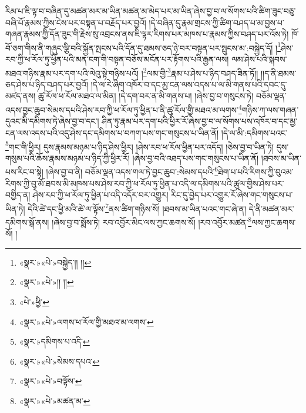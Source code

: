 རིམ་པ་ཇི་ལྟ་བ་བཞིན་དུ་མཚན་མར་མ་ཡིན་མཚན་མ་མེད་པར་མ་ཡིན་ཞེས་བྱ་བ་ལ་སོགས་པའི་ཚིག་ཟུང་བཅུ་བཞི་པོ་རྣམས་ཀྱིས་ངེས་པར་བསྟན་པ་བརྗོད་པར་བྱའོ། །དེ་བཞིན་དུ་རྣམ་གྲངས་ཀྱི་ཚིག་བཤད་པ་མ་བྱས་པ་གཞན་རྣམས་ཀྱི་དོན་ཟུང་གི་རྗེས་སུ་འབྲངས་ནས་ཇི་ལྟར་རིགས་པར་མཁས་པ་རྣམས་ཀྱིས་བཤད་པར་འོས་ཏེ། ཁོ་བོ་ཅག་གིས་ནི་གཞུང་ལྕི་བའི་སྐྱོན་སྤངས་པའི་དོན་དུ་ཐམས་ཅད་ཉེ་བར་བསྟན་པར་སྤུངས་མ་:བསྐྱེད་དོ། །\footnote{«སྣར་»«པེ་»བསྐྱེད་།། །།}ཤེས་རབ་ཀྱི་ཕ་རོལ་ཏུ་ཕྱིན་པའི་མན་ངག་གི་བསྟན་བཅོས་མངོན་པར་རྟོགས་པའི་རྒྱན་ལས། ལམ་ཤེས་པའི་སྐབས་མཐའ་གཉིས་རྣམ་པར་དག་པའི་ལེའུ་སྟེ་གཉིས་པའོ། །\footnote{«སྣར་»«པེ་»།། །།}ལམ་གྱི་\footnote{«པེ་»ཕྱི་}རྣམ་པ་ཤེས་པ་ཉིད་བཤད་ཟིན་ཏོ།། །།ད་ནི་ཐམས་ཅད་ཤེས་པ་ཉིད་བཤད་པར་བྱའོ། །དེ་ལ་རེ་ཞིག་འཁོར་བ་དང་མྱ་ངན་ལས་འདས་པ་ལ་མི་གནས་པའི་དབང་དུ་མཛད་ནས། ཚུ་རོལ་ཕ་རོལ་མཐའ་ལ་མིན། །དེ་དག་བར་ན་མི་གནས་པ། །ཞེས་བྱ་བ་གསུངས་ཏེ། བཅོམ་ལྡན་འདས་བྱང་ཆུབ་སེམས་དཔའི་ཤེས་རབ་ཀྱི་ཕ་རོལ་ཏུ་ཕྱིན་པ་ནི་ཚུ་རོལ་གྱི་མཐའ་མ་ལགས་\footnote{«སྣར་»«པེ་»ལགས་ཕ་རོལ་གྱི་མཐའ་མ་ལགས་}གཉིས་ཀ་ལས་གཞན་དུའང་མི་དམིགས་ཏེ་ཞེས་བྱ་བ་དང་། ཤིན་ཏུ་རྣམ་པར་དག་པའི་ཕྱིར་རོ་ཞེས་བྱ་བ་ལ་སོགས་པས་འཁོར་བ་དང་མྱ་ངན་ལས་འདས་པའི་འདུ་ཤེས་དང་དམིགས་པ་བཀག་པས་གང་གསུངས་པ་ཡིན་ནོ། །དེ་ལ་མི་:དམིགས་པའང་\footnote{«སྣར་»དམིགས་པ་འདི་}གང་གི་ཕྱིར། དུས་རྣམས་མཉམ་པ་ཉིད་ཤེས་ཕྱིར། །ཤེས་རབ་ཕ་རོལ་ཕྱིན་པར་འདོད། །ཅེས་བྱ་བ་ཡིན་ཏེ། དུས་གསུམ་པའི་ཆོས་རྣམས་མཉམ་པ་ཉིད་ཀྱི་ཕྱིར་རོ། །ཞེས་བྱ་བའི་འཐད་པས་གང་གསུངས་པ་ཡིན་ནོ། །ཐབས་མ་ཡིན་པས་རིང་བ་སྟེ། །ཞེས་བྱ་བ་ནི། བཅོམ་ལྡན་འདས་གལ་ཏེ་བྱང་ཆུབ་:སེམས་དཔའི་\footnote{«སྣར་»«པེ་»སེམས་དཔའ་}ཐེག་པ་པའི་རིགས་ཀྱི་བུའམ་རིགས་ཀྱི་བུ་མོ་ཐབས་མི་མཁས་པས་ཤེས་རབ་ཀྱི་ཕ་རོལ་ཏུ་ཕྱིན་པ་འདི་ལ་དམིགས་པའི་ཚུལ་གྱིས་ཤེས་པར་བགྱིད་ན། ཤེས་རབ་ཀྱི་ཕ་རོལ་ཏུ་ཕྱིན་པ་འདི་འདོར་བར་འགྱུར། རིང་དུ་བྱེད་པར་འགྱུར་རོ་ཞེས་གང་གསུངས་པ་ཡིན་ཏེ། དེའི་ཚེ་དང་ཕྱི་མའི་ཚེ་ལ་ལྟོས་\footnote{«སྣར་»«པེ་»བལྟོས་}ནས་ཚིག་གཉིས་སོ། །ཐབས་མ་ཡིན་པའང་གང་ཞེ་ན། དེ་ནི་མཚན་མར་དམིགས་སྒོ་ནས། །ཞེས་བྱ་བ་སྨོས་ཏེ། རབ་འབྱོར་མིང་ལས་ཀྱང་ཆགས་སོ། །རབ་འབྱོར་མཚན་\footnote{«སྣར་»«པེ་»མཚན་མ་}ལས་ཀྱང་ཆགས་སོ། །
